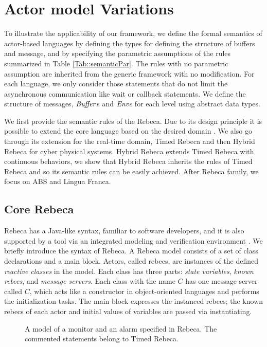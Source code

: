 \section{Actor model Variations}\label{sec::combine}
To illustrate the applicability of our framework, we define the formal semantics of actor-based languages by defining the types for defining the structure of buffers and message, and by specifying the parametric assumptions of the rules summarized in Table \ref{Tab::semanticPar}. The rules with no parametric assumption are inherited from the generic framework with no modification. For each language, we only consider those statements that do not limit the asynchronous communication like wait or callback statements. We define the structure of messages, $\mathit{Buffer}$s and $\mathit{Env}$s for each level using abstract data types. %

We first provide the semantic rules of the Rebeca. Due to its design principle it is possible to extend the core language based on the desired domain \cite{sirjani2011ten}. We also go through its extension for the real-time domain, Timed Rebeca and then Hybrid Rebeca for cyber physical systems. Hybrid Rebeca extends Timed Rebeca with continuous behaviors, we show that Hybrid Rebeca inherits the rules of Timed Rebeca and so its semantic rules can be easily achieved. After Rebeca family, we focus on ABS and Lingua Franca.




\subsection{Core Rebeca}
Rebeca \cite{sirjani2004modeling} has a Java-like syntax, familiar to software developers, and it is also supported by a tool via an integrated modeling and verification environment \cite{afra}.  We briefly introduce the syntax of Rebeca. A Rebeca model consists of a set of class declarations and a main block. Actors, called rebecs, are instances of the defined \emph{reactive classes} in the model. Each class has three parts: \emph{state variables}, \emph{known rebecs}, and \emph{message servers}. Each class with the name $C$ has one message server called $C$, which acts like a constructor in object-oriented languages and performs the initialization tasks. The main block expresses the instanced rebecs; the  known rebecs of each actor and initial values of variables are passed via instantiating. 
\begin{figure}[h]
	\centering
	
	\caption{A model of a monitor and an alarm specified in  Rebeca. The commented statements belong to Timed Rebeca.}
	\label{fig:Controller}
\end{figure}


